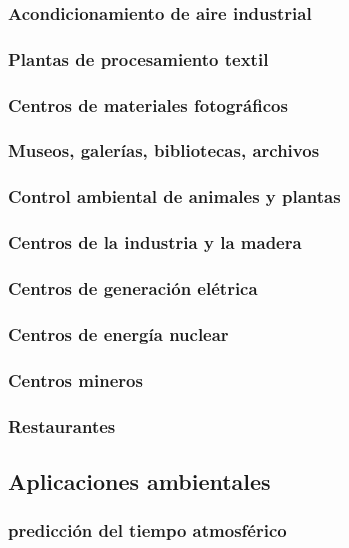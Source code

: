         \subsubsection{Acondicionamiento de aire industrial}
        \subsubsection{Plantas de procesamiento textil}
        \subsubsection{Centros de materiales fotográficos}
        \subsubsection{Museos, galerías, bibliotecas, archivos}
        \subsubsection{Control ambiental de animales y plantas}
        \subsubsection{Centros de la industria y la madera}
        \subsubsection{Centros de generación elétrica}
        \subsubsection{Centros de energía nuclear}
        \subsubsection{Centros mineros}
        \subsubsection{Restaurantes}
        \subsubsection{}

    \subsection{Aplicaciones ambientales}
        \subsubsection{predicción del tiempo atmosférico}
